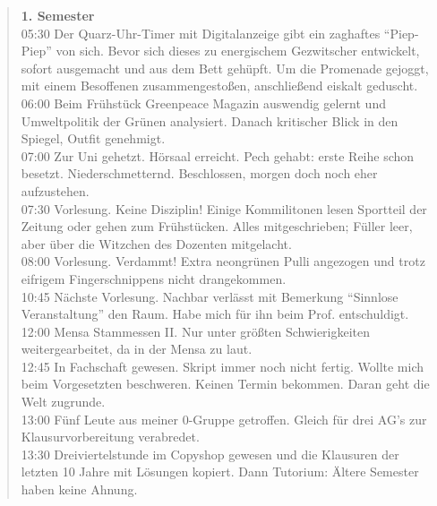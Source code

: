 \begin{verse}
\textbf{1. Semester}\\ 
05:30 Der Quarz-Uhr-Timer mit Digitalanzeige gibt ein zaghaftes "`Piep-Piep"' von sich. Bevor sich dieses zu energischem Gezwitscher entwickelt, sofort ausgemacht \linebreak und aus dem Bett gehüpft. Um die Promenade gejoggt, mit einem Besoffenen zusammengestoßen, anschließend eiskalt geduscht. \\
06:00 Beim Frühstück Greenpeace Magazin auswendig gelernt und Umweltpolitik der Grünen analysiert. Danach kritischer Blick in den Spiegel, Outfit genehmigt.\\ 
07:00 Zur Uni gehetzt. Hörsaal erreicht. Pech gehabt: erste Reihe schon besetzt. Niederschmetternd. Beschlossen, morgen doch noch eher aufzustehen.\\ 
07:30 Vorlesung. Keine Disziplin! Einige Kommilitonen lesen Sportteil der Zeitung oder gehen zum Frühstücken. Alles mitgeschrieben; Füller leer, aber über die Witzchen des Dozenten mitgelacht.\\ 
08:00 Vorlesung. Verdammt! Extra neongrünen Pulli angezogen und trotz eifrigem Fingerschnippens nicht drangekommen.\\
10:45 Nächste Vorlesung. Nachbar verlässt mit Bemerkung "`Sinnlose Veranstaltung"' den Raum. Habe mich für ihn beim Prof. entschuldigt.\\ 
12:00 Mensa Stammessen II. Nur unter größten Schwierigkeiten weitergearbeitet, da in der Mensa zu laut.\\ 
12:45 In Fachschaft gewesen. Skript immer noch nicht fertig. Wollte mich beim Vorgesetzten beschweren. Keinen Termin bekommen. Daran geht die Welt zugrunde.\\ 
13:00 Fünf Leute aus meiner 0-Gruppe getroffen. Gleich für drei AG's zur Klausurvorbereitung verabredet.\\
13:30 Dreiviertelstunde im Copyshop gewesen und die Klausuren der letzten 10 Jahre mit Lösungen kopiert. Dann Tutorium: Ältere Semester haben keine Ahnung.\\ 

\end{verse}
